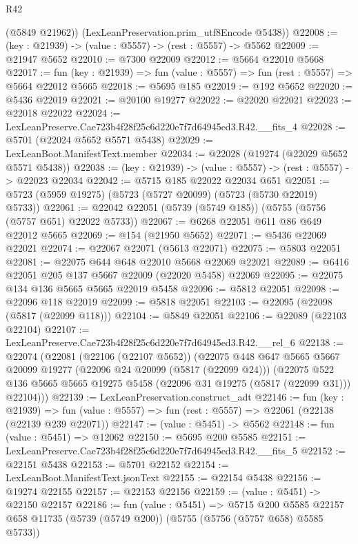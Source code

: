 \begin{lexlean}{R42}
\begin{coremodule}
        (@5849 @21962))
      (LexLeanPreservation.prim_utf8Encode @5438))
@22008 := (key : @21939) -> (value : @5557) -> (rest : @5557) -> @5562
@22009 := @21947 @5652
@22010 := @7300 @22009
@22012 := @5664 @22010 @5668
@22017 := fun (key : @21939) => fun (value : @5557) => fun (rest : @5557) => @5664 @22012 @5665
@22018 := @5695 @185
@22019 := @192 @5652
@22020 := @5436 @22019
@22021 := @20100 @19277
@22022 := @22020 @22021
@22023 := @22018 @22022
@22024 := LexLeanPreserve.Cae723b4f28f25c6d220e7f7d64945ed3.R42.__fits_4
@22028 := @5701 (@22024 @5652 @5571 @5438)
@22029 := LexLeanBoot.ManifestText.member
@22034 := @22028 (@19274 (@22029 @5652 @5571 @5438))
@22038 := (key : @21939) -> (value : @5557) -> (rest : @5557) -> @22023 @22034
@22042 := @5715 @185 @22022 @22034 @651
@22051 := @5723 (@5959 @19275) (@5723 (@5727 @20099) (@5723 (@5730 @22019) @5733))
@22061 := @22042 @22051 (@5739 (@5749 @185)) (@5755 (@5756 (@5757 @651) @22022 @5733))
@22067 := @6268 @22051 @611 @86 @649 @22012 @5665
@22069 := @154 (@21950 @5652)
@22071 := @5436 @22069 @22021
@22074 := @22067 @22071 (@5613 @22071)
@22075 := @5803 @22051
@22081 := @22075 @644 @648 @22010 @5668 @22069 @22021
@22089 := @6416 @22051 @205 @137 @5667 @22009 (@22020 @5458) @22069
@22095 := @22075 @134 @136 @5665 @5665 @22019 @5458
@22096 := @5812 @22051
@22098 := @22096 @118 @22019
@22099 := @5818 @22051
@22103 := @22095 (@22098 (@5817 (@22099 @118)))
@22104 := @5849 @22051
@22106 := @22089 (@22103 @22104)
@22107 := LexLeanPreserve.Cae723b4f28f25c6d220e7f7d64945ed3.R42.__rel_6
@22138 := @22074
    (@22081
      (@22106 (@22107 @5652))
      (@22075
        @448
        @647
        @5665
        @5667
        @20099
        @19277
        (@22096 @24 @20099 (@5817 (@22099 @24)))
        (@22075
          @522
          @136
          @5665
          @5665
          @19275
          @5458
          (@22096 @31 @19275 (@5817 (@22099 @31)))
          @22104)))
@22139 := LexLeanPreservation.construct_adt
@22146 := fun (key : @21939) =>
  fun (value : @5557) => fun (rest : @5557) => @22061 (@22138 (@22139 @239 @22071))
@22147 := (value : @5451) -> @5562
@22148 := fun (value : @5451) => @12062
@22150 := @5695 @200 @5585
@22151 := LexLeanPreserve.Cae723b4f28f25c6d220e7f7d64945ed3.R42.__fits_5
@22152 := @22151 @5438
@22153 := @5701 @22152
@22154 := LexLeanBoot.ManifestText.jsonText
@22155 := @22154 @5438
@22156 := @19274 @22155
@22157 := @22153 @22156
@22159 := (value : @5451) -> @22150 @22157
@22186 := fun (value : @5451) =>
  @5715
    @200
    @5585
    @22157
    @658
    @11735
    (@5739 (@5749 @200))
    (@5755 (@5756 (@5757 @658) @5585 @5733))

\end{coremodule}
\end{lexlean}
